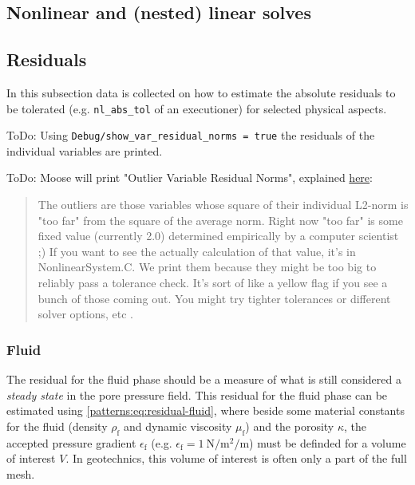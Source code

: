 \subsection{Nonlinear and (nested) linear solves}

\subsection{Residuals}

In this subsection data is collected on how to estimate the absolute residuals
to be tolerated (e.g. \texttt{nl\_abs\_tol} of an executioner) for selected
physical aspects.

ToDo: Using \texttt{Debug/show\_var\_residual\_norms = true} the residuals of
the individual variables are printed.

ToDo: Moose will print "Outlier Variable Residual Norms", explained
\href{https://groups.google.com/g/moose-users/c/76wkbH-cuFo/m/OT1Z6vbrm_0J}{here}:
\begin{quote}
  The outliers are those variables whose square of their individual L2-norm is
  "too far" from the square of the average norm. Right now "too far" is some
  fixed value (currently 2.0) determined empirically by a computer scientist ;)
  If you want to see the actually calculation of that value, it's in
  NonlinearSystem.C. We print them because they might be too big to reliably pass
  a tolerance check. It's sort of like a yellow flag if you see a bunch of those
  coming out. You might try tighter tolerances or different solver options, etc .
\end{quote}


\subsubsection{Fluid}

The residual for the fluid phase should be a measure of what is still
considered a \emph{steady state} in the pore pressure field. This residual for
the fluid phase can be estimated using \autoref{patterns:eq:residual-fluid},
where beside some material constants for the fluid (density $\rho_\mathrm{f}$
and dynamic viscosity $\mu_\mathrm{f}$) and the porosity $\kappa$, the accepted
pressure gradient $\epsilon_\mathrm{f}$ (e.g. $\epsilon_\mathrm{f} =
  \qty[per-mode = symbol]{1}{\newton\per\square\metre\per\metre} $) must be
definded for a volume of interest $V$. In geotechnics, this volume of interest
is often only a part of the full mesh.

